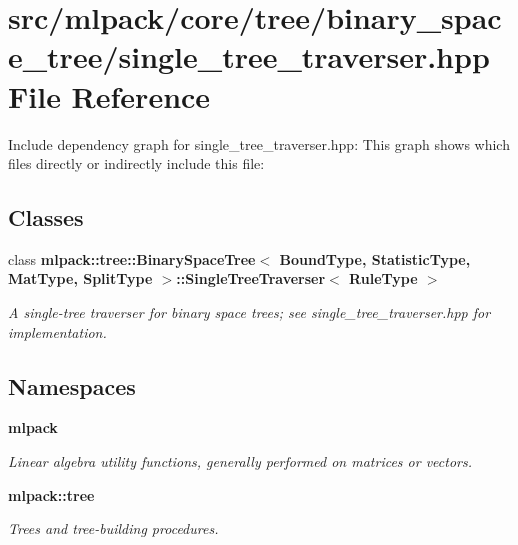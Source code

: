 \section{src/mlpack/core/tree/binary\-\_\-space\-\_\-tree/single\-\_\-tree\-\_\-traverser.hpp File Reference}
\label{binary__space__tree_2single__tree__traverser_8hpp}
Include dependency graph for single\-\_\-tree\-\_\-traverser.\-hpp\-:
This graph shows which files directly or indirectly include this file\-:
\subsection*{Classes}
\begin{DoxyCompactItemize}
\item 
class {\bf mlpack\-::tree\-::\-Binary\-Space\-Tree$<$ Bound\-Type, Statistic\-Type, Mat\-Type, Split\-Type $>$\-::\-Single\-Tree\-Traverser$<$ Rule\-Type $>$}
\begin{DoxyCompactList}\small\item\em A single-\/tree traverser for binary space trees; see single\-\_\-tree\-\_\-traverser.\-hpp for implementation. \end{DoxyCompactList}\end{DoxyCompactItemize}
\subsection*{Namespaces}
\begin{DoxyCompactItemize}
\item 
{\bf mlpack}
\begin{DoxyCompactList}\small\item\em Linear algebra utility functions, generally performed on matrices or vectors. \end{DoxyCompactList}\item 
{\bf mlpack\-::tree}
\begin{DoxyCompactList}\small\item\em Trees and tree-\/building procedures. \end{DoxyCompactList}\end{DoxyCompactItemize}
